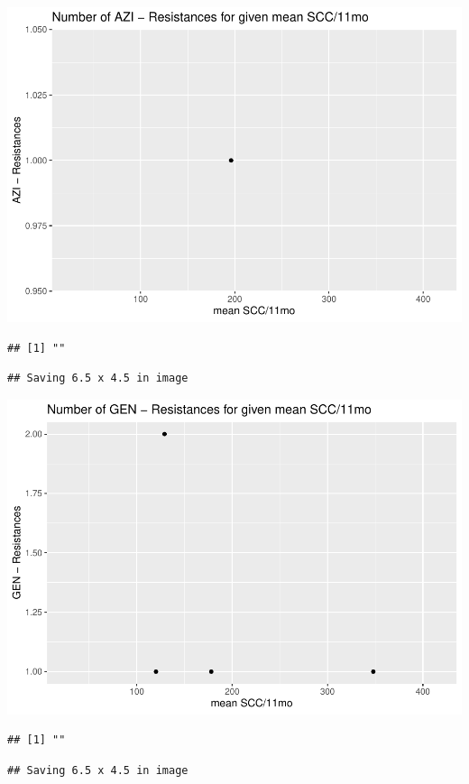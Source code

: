 \documentclass[
]{article}
\begin{document}
\includegraphics{NResistenzen_files/figure-latex/numerical_variables-13.pdf}

\begin{verbatim}
## [1] ""
\end{verbatim}

\begin{verbatim}
## Saving 6.5 x 4.5 in image
\end{verbatim}

\includegraphics{NResistenzen_files/figure-latex/numerical_variables-14.pdf}

\begin{verbatim}
## [1] ""
\end{verbatim}

\begin{verbatim}
## Saving 6.5 x 4.5 in image
\end{verbatim}
\end{document}
